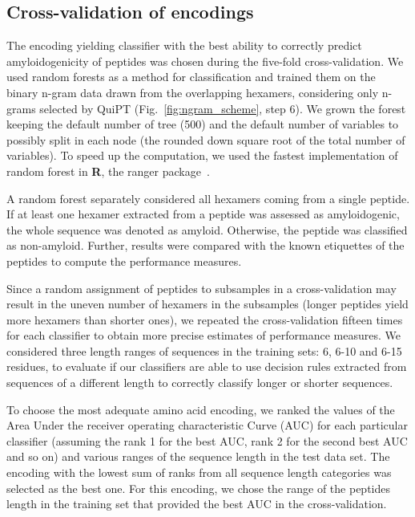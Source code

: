\documentclass[fleqn,10pt,twoside]{gcb15submission}
\begin{document}
\subsection{Cross-validation of encodings}

The encoding yielding classifier with the best ability to correctly predict 
amyloidogenicity of peptides was chosen during the five-fold cross-validation. 
We used random forests as a method for classification and trained them on the 
binary n-gram data drawn from the overlapping hexamers, considering only n-grams 
selected by QuiPT (Fig.~\ref{fig:ngram_scheme}, step 6). We grown the forest keeping 
the default number of tree (500) and the default number of variables to possibly 
split in each node (the rounded down square root of the total number of 
variables). To speed up the computation, we used the fastest implementation of 
random forest in \textbf{R}, the ranger package~\citep{wright_ranger:_2015}.

  A random forest separately considered all hexamers coming from a single 
peptide. If at least one hexamer extracted from a peptide was assessed as 
amyloidogenic, the whole sequence was denoted as amyloid. Otherwise, the peptide 
was classified as non-amyloid. Further, results were compared with the known 
etiquettes of the peptides to compute the performance measures.

  Since a random assignment of peptides to subsamples in a cross-validation may 
result in the uneven number of hexamers in the subsamples (longer peptides yield 
more hexamers than shorter ones), we repeated the cross-validation fifteen times 
for each classifier to obtain more precise estimates of performance measures. We 
considered three length ranges of sequences in the training sets: 6, 6-10 and 
6-15 residues, to evaluate if our classifiers are able to use decision rules 
extracted from sequences of a different length to correctly classify longer or 
shorter sequences. 

  To choose the most adequate amino acid encoding, we ranked the values of the 
Area Under the receiver operating characteristic Curve (AUC) for each particular 
classifier (assuming the rank 1 for the best AUC, rank 2 for the second best AUC 
and so on) and various ranges of the sequence length in the test data set. The 
encoding with the lowest sum of ranks from all sequence length categories was 
selected as the best one. For this encoding, we chose the range of the peptides 
length in the training set that provided the best AUC in the cross-validation. 
\end{document}
